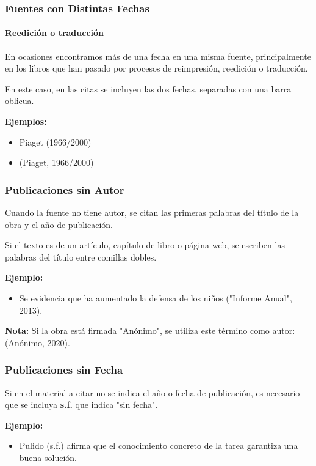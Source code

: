 \documentclass[aspectratio=169]{beamer}
\begin{document}
\begin{frame}
	\frametitle{Fuentes con Distintas Fechas}
	\framesubtitle{Reedición o traducción}
	
	En ocasiones encontramos más de una fecha en una misma fuente, principalmente en los libros que han pasado por procesos de reimpresión, reedición o traducción.
	
	\vspace{1em}
	
	En este caso, en las citas se incluyen las dos fechas, separadas con una barra oblicua.
	
	\vspace{1em}
	
	\textbf{Ejemplos:}
	\begin{itemize}
		\item Piaget (1966/2000)
		\item (Piaget, 1966/2000)
	\end{itemize}
\end{frame}

\begin{frame}
	\frametitle{Publicaciones sin Autor}
	Cuando la fuente no tiene autor, se citan las primeras palabras del título de la obra y el año de publicación.
	
	\vspace{1em}
	
	Si el texto es de un artículo, capítulo de libro o página web, se escriben las palabras del título entre comillas dobles.
	
	\vspace{1em}
	
	\textbf{Ejemplo:}
	\begin{itemize}
		\item Se evidencia que ha aumentado la defensa de los niños ("Informe Anual", 2013).
	\end{itemize}
	
	\vspace{1em}
	
	\textbf{Nota:} Si la obra está firmada "Anónimo", se utiliza este término como autor: (Anónimo, 2020).
\end{frame}

\begin{frame}
	\frametitle{Publicaciones sin Fecha}
	Si en el material a citar no se indica el año o fecha de publicación, es necesario que se incluya \textbf{s.f.} que indica "sin fecha".
	
	\vspace{1em}
	
	\textbf{Ejemplo:}
	\begin{itemize}
		\item Pulido (s.f.) afirma que el conocimiento concreto de la tarea garantiza una buena solución.
	\end{itemize}
\end{frame}
\end{document}
